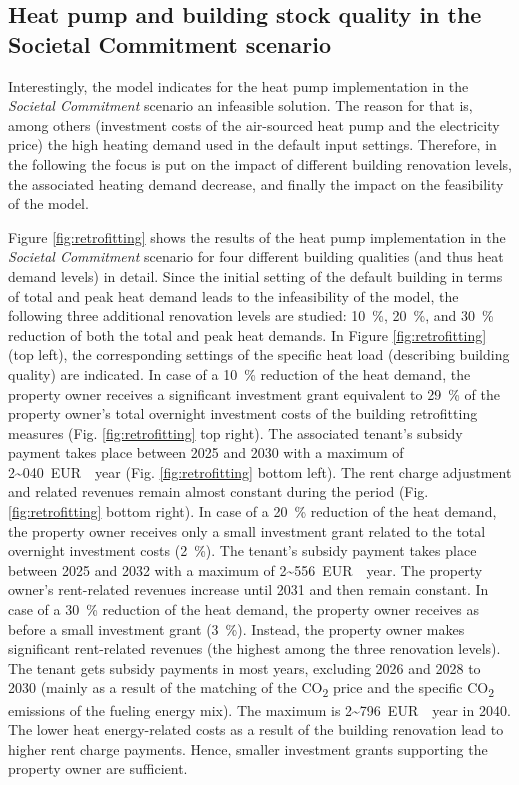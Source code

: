 \subsection{Heat pump and building stock quality in the Societal Commitment scenario}\label{res:heat_pump}
Interestingly, the model indicates for the heat pump implementation in the \textit{Societal Commitment} scenario an infeasible solution. The reason for that is, among others (investment costs of the air-sourced heat pump and the electricity price) the high heating demand used in the default input settings. Therefore, in the following the focus is put on the impact of different building renovation levels, the associated heating demand decrease, and finally the impact on the feasibility of the model.\vspace{0.5cm} 

Figure \ref{fig:retrofitting} shows the results of the heat pump implementation in the \textit{Societal Commitment} scenario for four different building qualities (and thus heat demand levels) in detail. Since the initial setting of the default building in terms of total and peak heat demand leads to the infeasibility of the model, the following three additional renovation levels are studied: \SI{10}{\%}, \SI{20}{\%}, and \SI{30}{\%} reduction of both the total and peak heat demands. In Figure \ref{fig:retrofitting} (top left), the corresponding settings of the specific heat load (describing building quality) are indicated. In case of a \SI{10}{\%} reduction of the heat demand, the property owner receives a significant investment grant equivalent to \SI{29}{\%} of the property owner's total overnight investment costs of the building retrofitting measures (Fig. \ref{fig:retrofitting} top right). The associated tenant's subsidy payment takes place between 2025 and 2030 with a maximum of \SI{2~040}{EUR \per year} (Fig. \ref{fig:retrofitting} bottom left). The rent charge adjustment and related revenues remain almost constant during the period (Fig. \ref{fig:retrofitting} bottom right). In case of a \SI{20}{\%} reduction of the heat demand, the property owner receives only a small investment grant related to the total overnight investment costs (\SI{2}{\%}). The tenant's subsidy payment takes place between 2025 and 2032 with a maximum of \SI{2~556}{EUR \per year}. The property owner's rent-related revenues increase until 2031 and then remain constant. In case of a \SI{30}{\%} reduction of the heat demand, the property owner receives as before a small investment grant (\SI{3}{\%}). Instead, the property owner makes significant rent-related revenues (the highest among the three renovation levels). The tenant gets subsidy payments in most years, excluding 2026 and 2028 to 2030 (mainly as a result of the matching of the CO\textsubscript{2} price and the specific CO\textsubscript{2} emissions of the fueling energy mix). The maximum is \SI{2~796}{EUR \per year} in 2040. The lower heat energy-related costs as a result of the building renovation lead to higher rent charge payments. Hence, smaller investment grants supporting the property owner are sufficient. 

